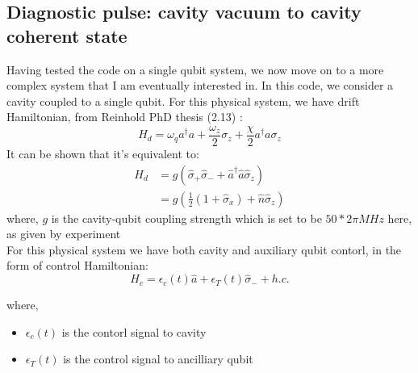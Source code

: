 \documentclass[12pt]{article}
\begin{document}



\subsection{Diagnostic pulse: cavity vacuum to cavity coherent state}
Having tested the code on a single qubit system, we now move on to a more complex system that I am eventually interested in. 
In this code, we consider a cavity coupled to a single qubit.
For this physical system, we have drift Hamiltonian, 
from Reinhold PhD thesis (2.13) \cite{reinhold2019}: 
\begin{equation}
    H_d = \omega_q a^\dagger a + \frac{\omega_z}{2} \sigma_z + \frac{\chi}{2} a^\dagger a \sigma_z
\end{equation}
It can be shown that it's equivalent to: %
$$
\begin{align}
    H_d &= g\left( \hat{\sigma}_+ \hat{\sigma}_- + \hat{a}^{\dagger}\hat{a}\hat{\sigma}_z \right) \\
    &= g \left( \frac{1}{2}(1+\hat{\sigma}_x) + \hat{n}\hat{\sigma}_z\right)
\end{align}
$$  
where, $g$ is the cavity-qubit coupling strength which is set to be $50*2 \pi MHz$ here, as given by experiment
\\
For this physical system we have both cavity and auxiliary qubit contorl, in the form of control Hamiltonian: 
\begin{equation}
    H_c = \epsilon_c(t) \hat{a} + \epsilon_T(t) \hat{\sigma}_- + h.c.
\end{equation}

where, 
\begin{itemize}
    \item $\epsilon_c(t)$ is the contorl signal to cavity
    \item $\epsilon_T(t)$ is the control signal to ancilliary qubit
\end{itemize} 
\end{document}
